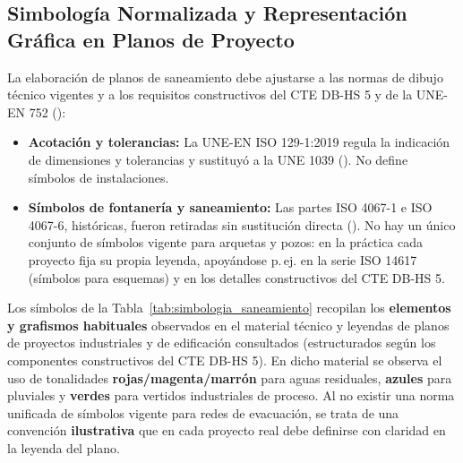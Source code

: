\documentclass{report}
\begin{document}
\subsection{Simbología Normalizada y Representación Gráfica en Planos de Proyecto}
La elaboración de planos de saneamiento debe ajustarse a las normas de dibujo técnico vigentes y a los requisitos constructivos del CTE DB-HS 5 y de la UNE-EN 752 (\cite{CTE_DB_HS5, UNE_EN_752}):
\begin{itemize}
    \item \textbf{Acotación y tolerancias:} La UNE-EN ISO 129-1:2019 regula la indicación de dimensiones y tolerancias y sustituyó a la UNE 1039 (\cite{UNE_EN_ISO_129_1}). No define símbolos de instalaciones.
    \item \textbf{Símbolos de fontanería y saneamiento:} Las partes ISO 4067-1 e ISO 4067-6, históricas, fueron retiradas sin sustitución directa (\cite{ISO_4067_1, ISO_4067_6}). No hay un único conjunto de símbolos vigente para arquetas y pozos: en la práctica cada proyecto fija su propia leyenda, apoyándose p.\,ej. en la serie ISO 14617 (símbolos para esquemas) y en los detalles constructivos del CTE DB-HS 5.
\end{itemize}

Los símbolos de la Tabla~\ref{tab:simbologia_saneamiento} recopilan los \textbf{elementos y grafismos habituales} observados en el material técnico y leyendas de planos de proyectos industriales y de edificación consultados (estructurados según los componentes constructivos del CTE DB-HS 5). En dicho material se observa el uso de tonalidades \textcolor{red!80!black}{\textbf{rojas/magenta/marrón}} para aguas residuales, \textcolor{blue!80!black}{\textbf{azules}} para pluviales y \textcolor{green!50!black}{\textbf{verdes}} para vertidos industriales de proceso. Al no existir una norma unificada de símbolos vigente para redes de evacuación, se trata de una convención \textbf{ilustrativa} que en cada proyecto real debe definirse con claridad en la leyenda del plano.
\end{document}
